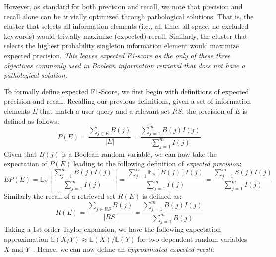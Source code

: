 However, as standard for both precision and recall, we note that precision and recall alone can be trivially optimized through pathological solutions.  That is, the cluster that selects all information elements (i.e., all time, all space, no excluded keywords) would trivially maximize (expected) recall.  Similarly, the cluster that selects the highest probability singleton information element would maximize expected precision.  \emph{This leaves expected F1-score as the only of these three objectives commonly used in Boolean information retrieval that does not have a pathological solution.}

To formally define expected F1-Score, we first begin with definitions of expected precision and recall.  Recalling our previous definitions, given a set of information elements  $E$  that match a user query and a relevant set $RS$, %
the precision of $E$ is defined as follows:
\begin{equation}
   P(E) = \dfrac{\sum_{j \in E} B(j)}{|E|} = \dfrac{\sum_{j=1}^m B(j)I(j)}{\sum_{j=1}^m I(j)} 
\end{equation}
Given that $B(j)$ is a Boolean random variable, we can now take the expectation of $P(E)$ leading to the following definition of 
\emph{expected precision}: 
\begin{equation}
EP(E)=\mathbb{E_{S}}\left[\dfrac{{\displaystyle \sum_{j=1}^{m}}B(j)I(j)}{{\displaystyle \sum_{j=1}^{m}}I(j)}\right]=\dfrac{{\displaystyle \sum_{j=1}^{m}}\mathbb{E_{S}}[B(j)]I(j)}{{\displaystyle \sum_{j=1}^{m}}I(j)}=\dfrac{{\displaystyle \sum_{j=1}^{m}}S(j)I(j)}{{\displaystyle \sum_{j=1}^{m}}I(j)}
\end{equation}
Similarly the recall of a retrieved set $R(E)$ is defined as:
\begin{equation}
   R(E) = \dfrac{\sum_{j \in RS} B(j)}{|RS|} = \dfrac{\sum_{j=1}^m B(j)I(j)}{ \sum_{j=1}^m B(j)} 
\end{equation}
Taking a 1st order Taylor expansion, we have the following expectation approximation %
$\mathbb{E}(X/Y)\approx \mathbb{E}(X)/ \mathbb{E}(Y)$ for two dependent random variables $X$ and $Y$~\cite{Kempen2000}. Hence, 
we can now define an \emph{approximated expected recall}: 
